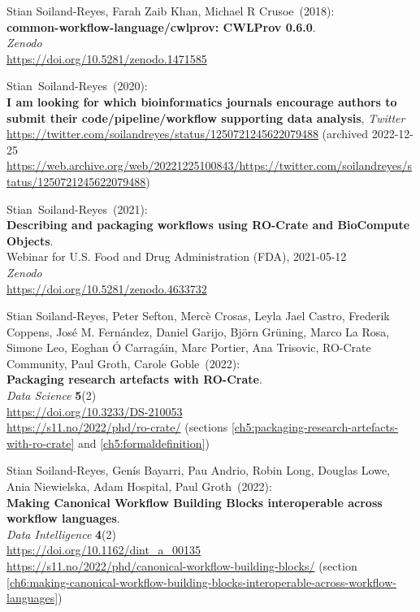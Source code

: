 \begin{thebibliography}{9}
Stian Soiland-Reyes, Farah Zaib Khan, Michael R Crusoe~(2018): \\
\textbf{common-workflow-language/cwlprov: CWLProv 0.6.0}.\\
\emph{Zenodo}\\
\url{https://doi.org/10.5281/zenodo.1471585}

Stian~Soiland-Reyes~(2020): \\
\textbf{I am looking for which bioinformatics journals encourage authors
to submit their code/pipeline/workflow supporting data analysis},
\emph{Twitter}\\
\url{https://twitter.com/soilandreyes/status/1250721245622079488}
(archived 2022-12-25 
\url{https://web.archive.org/web/20221225100843/https://twitter.com/soilandreyes/status/1250721245622079488})

Stian~Soiland-Reyes~(2021): \\
\textbf{Describing and packaging workflows using RO-Crate and BioCompute Objects}.\\
Webinar for U.S. Food and Drug Administration
(FDA), 2021-05-12\\
\emph{Zenodo}\\
\url{https://doi.org/10.5281/zenodo.4633732}

Stian Soiland-Reyes, Peter Sefton, Mercè
Crosas, Leyla Jael Castro, Frederik Coppens, José M. Fernández, Daniel
Garijo, Björn Grüning, Marco La Rosa, Simone Leo, Eoghan Ó Carragáin,
Marc Portier, Ana Trisovic, RO-Crate Community, Paul Groth, Carole Goble~(2022): \\
\textbf{Packaging research artefacts with RO-Crate}.\\
\emph{Data Science} \textbf{5}(2)\\
\url{https://doi.org/10.3233/DS-210053}\\
\url{https://s11.no/2022/phd/ro-crate/}
(sections \vref{ch5:packaging-research-artefacts-with-ro-crate} and \vref{ch5:formaldefinition})

Stian Soiland-Reyes, Genís Bayarri, Pau
Andrio, Robin Long, Douglas Lowe, Ania Niewielska, Adam Hospital, Paul
Groth~(2022): \\
\textbf{Making Canonical Workflow Building Blocks interoperable across workflow languages}.\\
\emph{Data Intelligence} \textbf{4}(2)\\
\url{https://doi.org/10.1162/dint_a_00135}\\
\url{https://s11.no/2022/phd/canonical-workflow-building-blocks/}
(section \vref{ch6:making-canonical-workflow-building-blocks-interoperable-across-workflow-languages})


\end{thebibliography}
